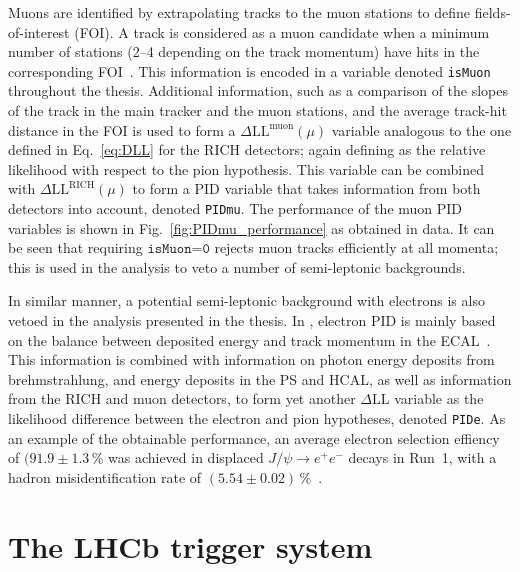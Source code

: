 Muons are identified by extrapolating tracks to the muon stations to define fields-of-interest (FOI). A track is considered as a muon candidate when a minimum number of stations (2--4 depending on the track momentum) have hits in the corresponding FOI~\cite{MuonPID,MuonPID2}. This information is encoded in a variable denoted \texttt{isMuon} throughout the thesis. Additional information, such as a comparison of the slopes of the track in the main tracker and the muon stations, and the average track-hit distance in the FOI is used to form a $\Delta \text{LL}^\text{muon}(\mu)$ variable analogous to the one defined in Eq.~\eqref{eq:DLL} for the RICH detectors; again defining as the relative likelihood with respect to the pion hypothesis. This variable can be combined with $\Delta \text{LL}^\text{RICH}(\mu)$ to form a PID variable that takes information from both detectors into account, denoted \texttt{PIDmu}. The performance of the muon PID variables is shown in Fig.~\ref{fig:PIDmu_performance} as obtained in data. It can be seen that requiring $\texttt{isMuon=0}$ rejects muon tracks efficiently at all momenta; this is used in the analysis to veto a number of semi-leptonic backgrounds.

In similar manner, a potential semi-leptonic background with electrons is also vetoed in the analysis presented in the thesis. In \lhcb, electron PID is mainly based on the balance between deposited energy and track momentum in the ECAL~\cite{ElectronPID}. This information is combined with information on photon energy deposits from brehmstrahlung, and energy deposits in the PS and HCAL, as well as information from the RICH and muon detectors, to form yet another $\Delta\text{LL}$ variable as the likelihood difference between the electron and pion hypotheses, denoted \texttt{PIDe}. As an example of the obtainable performance, an average electron selection effiency of $(91.9\pm1.3$\,\% was achieved in displaced $J/\psi\to e^+e^-$ decays in Run~1, with a hadron misidentification rate of $(5.54\pm0.02)$\,\%~\cite{LHCb-Performance}.



\section{The LHCb trigger system} %
\label{sec:the_lhcb_triggerring_system}

